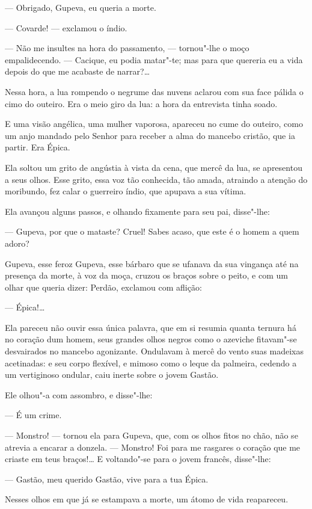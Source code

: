 --- Obrigado, Gupeva, eu queria a morte.

--- Covarde! --- exclamou o índio.

--- Não me insultes na hora do passamento, --- tornou"-lhe o moço
empalidecendo. --- Cacique, eu podia matar"-te; mas para que quereria eu
a vida depois do que me acabaste de narrar?\ldots{}

Nessa hora, a lua rompendo o negrume das nuvens aclarou com sua face
pálida o cimo do outeiro. Era o meio giro da lua: a hora da entrevista
tinha soado.

E uma visão angélica, uma mulher vaporosa, apareceu no cume do outeiro,
como um anjo mandado pelo Senhor para receber a alma do mancebo cristão,
que ia partir. Era Épica.

Ela soltou um grito de angústia à vista da cena, que mercê da lua, se
apresentou a seus olhos. Esse grito, essa voz tão conhecida, tão amada,
atraindo a atenção do moribundo, fez calar o guerreiro índio, que
apupava a sua vítima.

Ela avançou alguns passos, e olhando fixamente para seu pai, disse"-lhe:

--- Gupeva, por que o mataste? Cruel! Sabes acaso, que este é o homem a
quem adoro?

Gupeva, esse feroz Gupeva, esse bárbaro que se ufanava da sua vingança
até na presença da morte, à voz da moça, cruzou os braços sobre o peito,
e com um olhar que queria dizer: Perdão, exclamou com aflição:

--- Épica!\ldots{}

Ela pareceu não ouvir essa única palavra, que em si resumia quanta
ternura há no coração dum homem, seus grandes olhos negros como o
azeviche fitavam"-se desvairados no mancebo agonizante. Ondulavam à mercê
do vento suas madeixas acetinadas: e seu corpo flexível, e mimoso como o
leque da palmeira, cedendo a um vertiginoso ondular, caiu inerte sobre o
jovem Gastão.

Ele olhou"-a com assombro, e disse"-lhe:

--- É um crime.

--- Monstro! --- tornou ela para Gupeva, que, com os olhos fitos no chão,
não se atrevia a encarar a donzela. --- Monstro! Foi para me rasgares o
coração que me criaste em teus braços!\ldots{} E voltando"-se para o jovem
francês, disse"-lhe:

--- Gastão, meu querido Gastão, vive para a tua Épica.

Nesses olhos em que já se estampava a morte, um átomo de vida
reapareceu.

